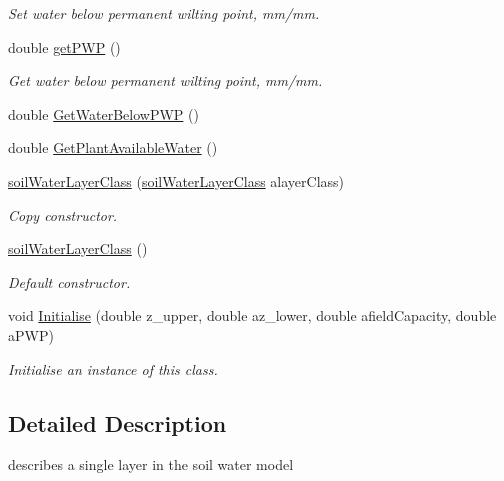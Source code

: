 \begin{DoxyCompactItemize}
\begin{DoxyCompactList}\small\item\em Set water below permanent wilting point, mm/mm. \end{DoxyCompactList}\item 
double \mbox{\hyperlink{classsimplesoil_model_1_1soil_water_layer_class_a742a2798ad2990806996ba42b18e4525}{get\+P\+WP}} ()
\begin{DoxyCompactList}\small\item\em Get water below permanent wilting point, mm/mm. \end{DoxyCompactList}\item 
double \mbox{\hyperlink{classsimplesoil_model_1_1soil_water_layer_class_a0a20dd34e909b2166985ecc5ecaa6b48}{Get\+Water\+Below\+P\+WP}} ()
\item 
double \mbox{\hyperlink{classsimplesoil_model_1_1soil_water_layer_class_a94f4c56bc31d4220c15ee59108e7cb9c}{Get\+Plant\+Available\+Water}} ()
\item 
\mbox{\hyperlink{classsimplesoil_model_1_1soil_water_layer_class_aabd96ad7b89d174a00c07bc5e3e72ed1}{soil\+Water\+Layer\+Class}} (\mbox{\hyperlink{classsimplesoil_model_1_1soil_water_layer_class}{soil\+Water\+Layer\+Class}} alayer\+Class)
\begin{DoxyCompactList}\small\item\em Copy constructor. \end{DoxyCompactList}\item 
\mbox{\hyperlink{classsimplesoil_model_1_1soil_water_layer_class_ae30c9a4959408ccca1cfc3233d96e9da}{soil\+Water\+Layer\+Class}} ()
\begin{DoxyCompactList}\small\item\em Default constructor. \end{DoxyCompactList}\item 
void \mbox{\hyperlink{classsimplesoil_model_1_1soil_water_layer_class_aeb0889b8e65ad603be4d729c3eef94db}{Initialise}} (double z\+\_\+upper, double az\+\_\+lower, double afield\+Capacity, double a\+P\+WP)
\begin{DoxyCompactList}\small\item\em Initialise an instance of this class. \end{DoxyCompactList}\end{DoxyCompactItemize}


\subsection{Detailed Description}
describes a single layer in the soil water model 

